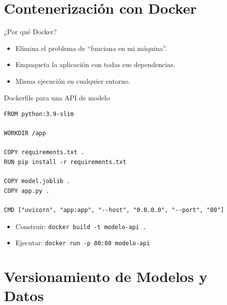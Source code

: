 \documentclass[aspectratio=169, 10pt, xcolor=table]{beamer}
\begin{document}
\section{Contenerización con Docker}

\begin{frame}{¿Por qué Docker?}
    \begin{itemize}
        \item Elimina el problema de ``funciona en mi máquina''.
        \item Empaqueta la aplicación con todas sus dependencias.
        \item Misma ejecución en cualquier entorno.
    \end{itemize}
\end{frame}

\begin{frame}[fragile]{Dockerfile para una API de modelo}
    \begin{lstlisting}
FROM python:3.9-slim

WORKDIR /app

COPY requirements.txt .
RUN pip install -r requirements.txt

COPY model.joblib .
COPY app.py .

CMD ["uvicorn", "app:app", "--host", "0.0.0.0", "--port", "80"]
    \end{lstlisting}
    \begin{itemize}
        \item Construir: \texttt{docker build -t modelo-api .}
        \item Ejecutar: \texttt{docker run -p 80:80 modelo-api}
    \end{itemize}
\end{frame}

\section{Versionamiento de Modelos y Datos}
\end{document}
